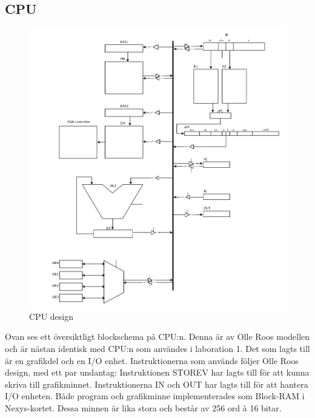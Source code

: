 \subsection{CPU}
	\begin{center}
		\begin{figure}[H]
    	\centering
			\includegraphics[scale=0.40]{../grafik/overall_design.png}
			\caption{CPU design}
			\label{fig:cpu}
		\end{figure}
	\end{center}
Ovan ses ett översiktligt blockschema på CPU:n. Denna är av Olle Roos modellen och är nästan identisk med CPU:n som användes i laboration 1. Det som lagts till är en grafikdel och en I/O enhet. Instruktionerna som används följer Olle Roos design, med ett par undantag: Instruktionen STOREV har lagts till för att kunna skriva till grafikminnet. Instruktionerna IN och OUT har lagts till för att hantera I/O enheten.
Både program och grafikminne implementerades som Block-RAM i Nexys-kortet. Dessa minnen är lika stora och består av 256 ord à 16 bitar.
